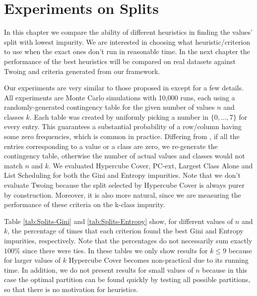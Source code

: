 \newpage

\chapter{Experiments on Splits}
\label{chap:experiments-splits}

In this chapter we compare the ability of different heuristics in finding the values' split with lowest impurity. We are interested in choosing what heuristic/criterion to use when the exact ones don't run in reasonable time. In the next chapter the performance of the best heuristics will be compared on real datasets against Twoing and criteria generated from our framework.

Our experiments are very similar to those proposed in \cite{journals/datamine/CoppersmithHH99} except for a few details. All experiments are Monte Carlo simulations with 10,000 runs, each using a randomly-generated contingency table for the given number of values $n$ and classes $k$. Each table  was created by uniformly picking a number in $\{0, \ldots, 7\}$ for every entry. This guarantees a substantial probability of a row/column having some zero frequencies, which is common in practice. Differing from  \cite{journals/datamine/CoppersmithHH99}, if all the entries corresponding to a value or a class are zero, we re-generate the contingency table, otherwise the number of actual values and classes would not match $n$ and $k$. We evaluated Hypercube Cover, PC-ext,
Largest Class Alone and List Scheduling for both the Gini and Entropy impurities. Note that we don't evaluate Twoing because the split selected by Hypercube Cover is always purer by construction. Moreover, it is also more natural, since we are measuring the performance of these criteria on the k-class impurity.

Table \ref{tab:Splits-Gini} and \ref{tab:Splits-Entropy} show, for different values of $n$ and $k$, the percentage of times that
each criterion found the best Gini and Entropy impurities, respectively. Note that the percentages do not necessarily sum exactly $100\%$ since
there were ties. In these tables we only show results for $k \leq 9$ because for larger values
of $k$ Hypercube Cover becomes non-practical due to its running time. In addition, we do not present results for small values of $n$ because in this
case the optimal  partition can be found quickly by testing all possible partitions, so that there is no motivation for heuristics.

